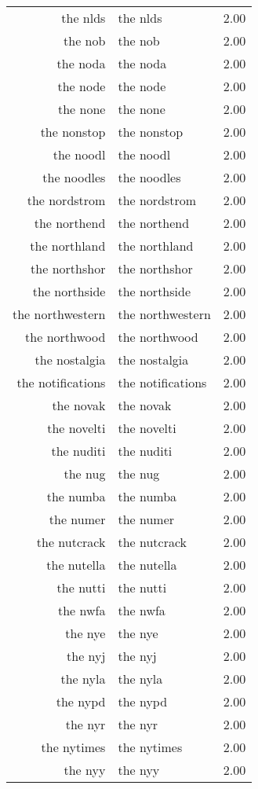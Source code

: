 \begin{table}[ht]
\begin{tabular}{rlr}
  the nlds & the nlds & 2.00 \\ 
  the nob & the nob & 2.00 \\ 
  the noda & the noda & 2.00 \\ 
  the node & the node & 2.00 \\ 
  the none & the none & 2.00 \\ 
  the nonstop & the nonstop & 2.00 \\ 
  the noodl & the noodl & 2.00 \\ 
  the noodles & the noodles & 2.00 \\ 
  the nordstrom & the nordstrom & 2.00 \\ 
  the northend & the northend & 2.00 \\ 
  the northland & the northland & 2.00 \\ 
  the northshor & the northshor & 2.00 \\ 
  the northside & the northside & 2.00 \\ 
  the northwestern & the northwestern & 2.00 \\ 
  the northwood & the northwood & 2.00 \\ 
  the nostalgia & the nostalgia & 2.00 \\ 
  the notifications & the notifications & 2.00 \\ 
  the novak & the novak & 2.00 \\ 
  the novelti & the novelti & 2.00 \\ 
  the nuditi & the nuditi & 2.00 \\ 
  the nug & the nug & 2.00 \\ 
  the numba & the numba & 2.00 \\ 
  the numer & the numer & 2.00 \\ 
  the nutcrack & the nutcrack & 2.00 \\ 
  the nutella & the nutella & 2.00 \\ 
  the nutti & the nutti & 2.00 \\ 
  the nwfa & the nwfa & 2.00 \\ 
  the nye & the nye & 2.00 \\ 
  the nyj & the nyj & 2.00 \\ 
  the nyla & the nyla & 2.00 \\ 
  the nypd & the nypd & 2.00 \\ 
  the nyr & the nyr & 2.00 \\ 
  the nytimes & the nytimes & 2.00 \\ 
  the nyy & the nyy & 2.00 \\ 

\end{tabular}
\end{table}
